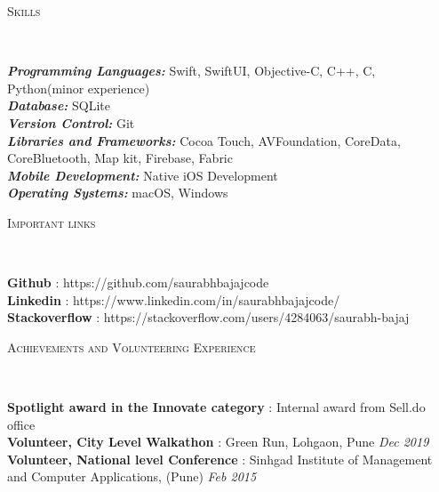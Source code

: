 \documentclass[9pt]{article}
\newenvironment{changemargin}[2]{%
  \begin{list}{}{%
    \setlength{\topsep}{0pt}%
    \setlength{\leftmargin}{#1}%
    \setlength{\rightmargin}{#2}%
    \setlength{\listparindent}{\parindent}%
    \setlength{\itemindent}{\parindent}%
    \setlength{\parsep}{\parskip}%
  }%
  \item[]}{\end{list}
}
\newcommand{\lineover}{
    \begin{changemargin}{-0.05in}{-0.05in}
        \vspace*{-8pt}
        \hrulefill \\
        \vspace*{-2pt}
    \end{changemargin}
}
\newcommand{\header}[1]{
    \begin{changemargin}{-0.5in}{-0.5in}
        \scshape{#1}\\
    \lineover
    \end{changemargin}
}
\newenvironment{body} {
    \vspace*{-16pt}
    \begin{changemargin}{-0.25in}{-0.5in}
  }
    {\end{changemargin}
}
\begin{document}
\newpage{}


\header{Skills}

\begin{body}
    \vspace{14pt}
    \emph{\textbf{Programming Languages:}}{} Swift, SwiftUI, Objective-C, C++, C, Python(minor experience)\\
    \vspace*{2pt}
    \emph{\textbf{Database:}}{} SQLite\\
    \vspace*{2pt}
    \emph{\textbf{Version Control:}}{} Git\\
    \vspace*{2pt}
    \emph{\textbf{Libraries and Frameworks:}}{} Cocoa Touch, AVFoundation, CoreData, CoreBluetooth, Map kit,
Firebase, Fabric \\
\vspace*{2pt}
    \emph{\textbf{Mobile Development:}}{} Native iOS Development \\
    \vspace*{2pt}
    \emph{\textbf{Operating Systems:}}{} macOS, Windows\\
\end{body}

\smallskip
\smallskip
\smallskip
\smallskip


\header{Important links}

\begin{body}
    \vspace{14pt}
    \textbf{Github} : https://github.com/saurabhbajajcode \hfill{}\\
    \smallskip
    \textbf{Linkedin} : https://www.linkedin.com/in/saurabhbajajcode/ \hfill{}\\
    \smallskip
    \textbf{Stackoverflow} : https://stackoverflow.com/users/4284063/saurabh-bajaj \hfill{}\\
\end{body}

\smallskip

\header{Achievements and Volunteering Experience}

\begin{body}
    \vspace{14pt}
    \textbf{Spotlight award in the Innovate category} : Internal award from Sell.do office\\
    \smallskip
    \textbf{Volunteer, City Level Walkathon} : Green Run, Lohgaon, Pune \hfill{} \emph{Dec 2019}\\
    \smallskip
    \textbf{Volunteer, National level Conference} : Sinhgad Institute of Management and Computer Applications, (Pune) \hfill {} \emph{Feb 2015}\\
\end{body}
\end{document}
